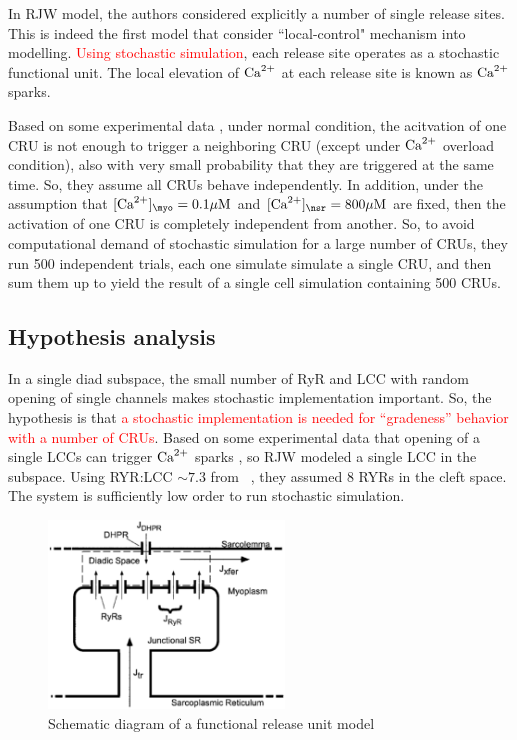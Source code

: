 In RJW model, the authors considered explicitly a number of single release
sites. This is indeed the first model that consider ``local-control" mechanism
into modelling. \textcolor{red}{Using stochastic simulation}, each release site
operates as a stochastic functional unit. The local elevation of ${\text{Ca}^{2+}}$ at each
release site is known as ${\text{Ca}^{2+}}$ sparks.

Based on some experimental data \citep{cannell1995b,cheng1996csc}, under normal
condition, the acitvation of one CRU is not enough to trigger a neighboring CRU
(except under ${\text{Ca}^{2+}}$ overload condition), also with very small probability that
they are triggered at the same time. So, they assume all CRUs behave
independently. In addition, under the assumption that $[\Ca]_\myo = 0.1\muM$ and
$[\Ca]_\nsr = 800\muM$ are fixed, then the activation of one CRU is completely
independent from another. So, to avoid computational demand of stochastic
simulation for a large number of CRUs, they run 500 independent trials, each one
simulate simulate a single CRU, and then sum them up to yield the result of a
single cell simulation containing 500 CRUs.

\subsection{Hypothesis analysis}
\label{sec:hypothesis-analysis-6}

In a single diad subspace, the small number of RyR and LCC with random opening
of single channels makes stochastic implementation important.
So, the hypothesis is that \textcolor{red}{ a stochastic implementation is
needed for
  ``gradeness'' behavior with a number of CRUs}.
Based on some experimental data that opening of a single LCCs can trigger ${\text{Ca}^{2+}}$
sparks \citep{cannell1995b,lopez-lopez1995}, so RJW modeled a single LCC in the
subspace. Using RYR:LCC $\sim 7.3$ from ~\citep{bers1993rrd}, they assumed 8
RYRs in the cleft space. The system is sufficiently low order to run stochastic
simulation. 

\begin{figure}[hbt]
 \centerline{\includegraphics[height=5cm, angle=0]{./images/diadic_subspace.eps}}
\caption{Schematic diagram of a functional release unit model}
\label{fig:diadic_subspace}
\end{figure}


